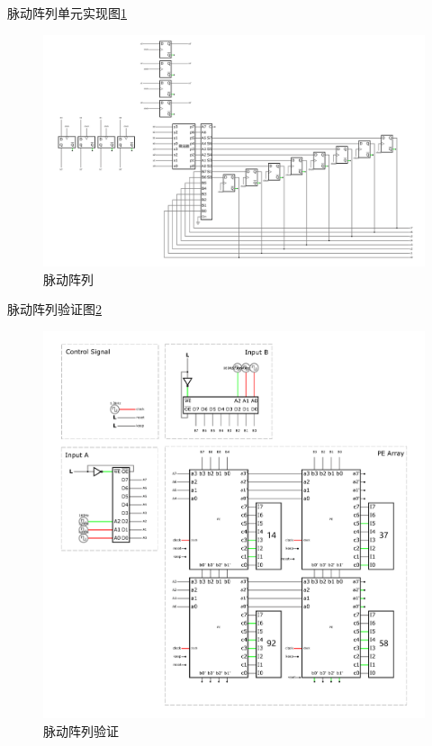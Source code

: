 \documentclass{article}
\begin{document}
脉动阵列单元实现图\ref{fig:PE}

\begin{figure}[htbp]
    \centering
    \includegraphics[width=1\textwidth]{脉动阵列.pdf}
    \caption{脉动阵列}
    \label{fig:PE}
\end{figure}

脉动阵列验证图\ref{fig:PEyanzheng}

\begin{figure}[htbp]
    \centering
    \includegraphics[width=1\textwidth]{PE验证_1.pdf}
    \caption{脉动阵列验证}
    \label{fig:PEyanzheng}
\end{figure}
\end{document}
